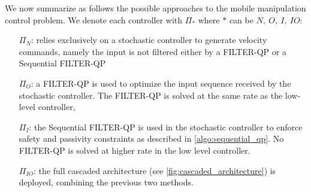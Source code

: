 We now summarize as follows the possible approaches to the mobile manipulation control problem. We denote each controller with $\Pi_{*}$ where $*$ can be $N,\ O,\ I,\ IO$:
\begin{itemize}
    \item[$\Pi_{N}$:] relies exclusively on a stochastic controller to generate velocity commands, namely the input is not filtered either by a FILTER-QP or a Sequential FILTER-QP
    \item[$\Pi_{O}$:] a FILTER-QP is used to optimize the input sequence received by the stochastic controller. The FILTER-QP is solved at the same rate as the low-level controller,
    \item[$\Pi_{I}$:] the Sequential FILTER-QP is used in the stochastic controller to enforce safety and passivity constraints  as described in \algo \ref{algo:sequential_qp}. No FILTER-QP is solved at higher rate in the low level controller.
    \item[$\Pi_{IO}$:] the full cascaded architecture (see \fig \ref{fig:cascaded_architecture}) is deployed, combining the previous two methods.
\end{itemize}

